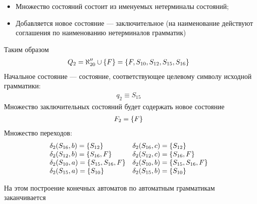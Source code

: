 \begin{itemize}
	      \begin{itemize}
		      \item Множество состояний состоит из именуемых нетерминалы состояний;
		      \item Добавляется новое состояние --- заключительное (на наименование действуют соглашения по наименованию нетерминалов грамматик)
	      \end{itemize}
	      Таким образом
	      \begin{align*}
		      Q_2 = \aleph''_{20} \cup \left\{F\right\} = \left\{F, S_{10}, S_{12}, S_{15}, S_{16}\right\}
	      \end{align*}
	      Начальное состояние --- состояние, соответствующее целевому символу исходной грамматики:
	      \begin{align*}
		      q_2 \equiv S_{15}
	      \end{align*}
	      Множество заключительных состояний будет содержать новое состояние
	      \begin{align*}
		      F_2 = \left\{F\right\}
	      \end{align*}
	      Множество переходов:
	      \begin{align*}
		      \begin{array}{lll}
			      \delta_2(S_{16}, b) = \left\{S_{12}\right\}            & \delta_2(S_{16}, c) = \left\{S_{12}\right\}            \\
			      \delta_2(S_{12}, b) = \left\{S_{16}, F\right\}         & \delta_2(S_{12}, c) = \left\{S_{16}, F\right\}         \\
			      \delta_2(S_{10}, a) = \left\{S_{15}, S_{16}, F\right\} & \delta_2(S_{10}, b) = \left\{S_{15}, S_{16}, F\right\} \\
			      \delta_2(S_{15}, a) = \left\{S_{10}\right\}            & \delta_2(S_{15}, b) = \left\{S_{10}\right\}
		      \end{array}
	      \end{align*}
\end{itemize}
На этом построение конечных автоматов по автоматным грамматикам заканчивается
